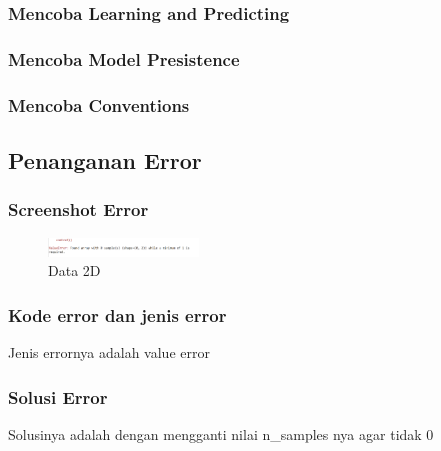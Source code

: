         \subsubsection{Mencoba Learning and Predicting}
        \hfill \break 

        \subsubsection{Mencoba Model Presistence}
        \hfill \break 

        \subsubsection{Mencoba Conventions}
        \hfill \break 
    \subsection{Penanganan Error}
        \subsubsection{Screenshot Error}
        \begin{figure}[H]
            \includegraphics[width=4cm]{figures/1174040/chap1/error.png}
            \centering
            \caption{Data 2D}
        \end{figure}
        \subsubsection{Kode error dan jenis error}
        Jenis errornya adalah value error
        \hfill \break 
        \subsubsection{Solusi Error}
        Solusinya adalah dengan mengganti nilai n\_samples nya agar tidak 0